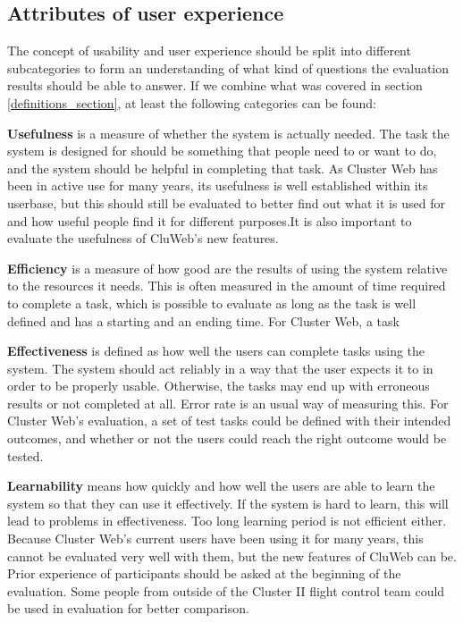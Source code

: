 \subsection{Attributes of user experience}\label{usability_attributes}
The concept of usability and user experience should be split into different subcategories to form an understanding of what kind of questions the evaluation results should be able to answer. If we combine what was covered in section \ref{definitions_section}, at least the following categories can be found:

\textbf{Usefulness} is a measure of whether the system is actually needed. The task the system is designed for should be something that people need to or want to do, and the system should be helpful in completing that task. As Cluster Web has been in active use for many years, its usefulness is well established within its userbase, but this should still be evaluated to better find out what it is used for and how useful people find it for different purposes.It is also important to evaluate the usefulness of CluWeb's new features.

\textbf{Efficiency} is a measure of how good are the results of using the system relative to the resources it needs. This is often measured in the amount of time required to complete a task, which is possible to evaluate as long as the task is well defined and has a starting and an ending time. For Cluster Web, a task

\textbf{Effectiveness} is defined as how well the users can complete tasks using the system. The system should act reliably in a way that the user expects it to in order to be properly usable. Otherwise, the tasks may end up with erroneous results or not completed at all. Error rate is an usual way of measuring this. For Cluster Web's evaluation, a set of test tasks could be defined with their intended outcomes, and whether or not the users could reach the right outcome would be tested.

\textbf{Learnability} means how quickly and how well the users are able to learn the system so that they can use it effectively. If the system is hard to learn, this will lead to problems in effectiveness. Too long learning period is not efficient either. Because Cluster Web's current users have been using it for many years, this cannot be evaluated very well with them, but the new features of CluWeb can be. Prior experience of participants should be asked at the beginning of the evaluation. Some people from outside of the Cluster II flight control team could be used in evaluation for better comparison.

